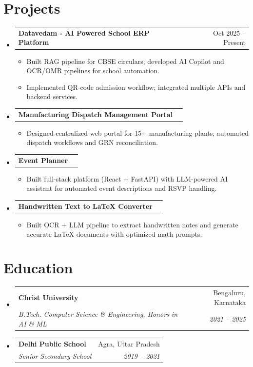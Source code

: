 \documentclass[letterpaper,10pt]{article}
\makeatletter
\newcommand{\resumeItem}[1]{
  \item\small{
    {#1 \vspace{-1pt}}
  }
}
\newcommand{\resumeSubheading}[4]{
  \vspace{-1pt}\item
    \begin{tabular*}{0.97\textwidth}[t]{l@{\extracolsep{\fill}}r}
      \textbf{#1} & #2 \\
      \textit{\small #3} & \textit{\small #4} \\
    \end{tabular*}\vspace{-5pt}
}
\newcommand{\resumeProjectHeading}[2]{
    \item
    \begin{tabular*}{0.97\textwidth}{l@{\extracolsep{\fill}}r}
      \small#1 & #2 \\
    \end{tabular*}\vspace{-1pt}
}
\newcommand{\resumeSubHeadingListStart}{\begin{itemize}[leftmargin=0.15in, label={}]}
\newcommand{\resumeSubHeadingListEnd}{\end{itemize}\vspace{-5pt}}
\newcommand{\resumeItemListStart}{\begin{itemize}\vspace{-3pt}}
\newcommand{\resumeItemListEnd}{\end{itemize}\vspace{-2pt}}
\makeatother
\begin{document}
\section{Projects}
\resumeSubHeadingListStart
    \resumeProjectHeading
      {\textbf{Datavedam - AI Powered School ERP Platform}}{Oct 2025 -- Present}
      \resumeItemListStart
        \resumeItem{Built RAG pipeline for CBSE circulars; developed AI Copilot and OCR/OMR pipelines for school automation.}
        \resumeItem{Implemented QR-code admission workflow; integrated multiple APIs and backend services.}
      \resumeItemListEnd
    \resumeProjectHeading
      {\textbf{Manufacturing Dispatch Management Portal}}{}
      \resumeItemListStart
        \resumeItem{Designed centralized web portal for 15+ manufacturing plants; automated dispatch workflows and GRN reconciliation.}
      \resumeItemListEnd
    \resumeProjectHeading
      {\textbf{Event Planner}}{}
      \resumeItemListStart
        \resumeItem{Built full-stack platform (React + FastAPI) with LLM-powered AI assistant for automated event descriptions and RSVP handling.}
      \resumeItemListEnd
    \resumeProjectHeading
      {\textbf{Handwritten Text to LaTeX Converter}}{}
      \resumeItemListStart
        \resumeItem{Built OCR + LLM pipeline to extract handwritten notes and generate accurate LaTeX documents with optimized math prompts.}
      \resumeItemListEnd
\resumeSubHeadingListEnd

\section{Education}
\resumeSubHeadingListStart
    \resumeSubheading
      {Christ University}{Bengaluru, Karnataka}
      {B.Tech. Computer Science \& Engineering, Honors in AI \& ML}{2021 -- 2025}
    \resumeSubheading
      {Delhi Public School}{Agra, Uttar Pradesh}
      {Senior Secondary School}{2019 -- 2021}
\resumeSubHeadingListEnd
\end{document}
